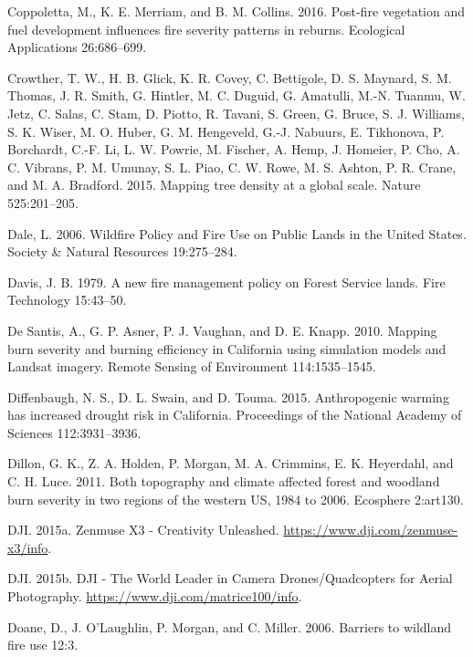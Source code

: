 \documentclass[twoside,12pt,final]{ucthesis-CA2012}
\begin{document}
\begin{ucmainmatter}
\hypertarget{ref-coppoletta2016}{}
Coppoletta, M., K. E. Merriam, and B. M. Collins. 2016. Post-fire
vegetation and fuel development influences fire severity patterns in
reburns. Ecological Applications 26:686--699.

\hypertarget{ref-crowther2015}{}
Crowther, T. W., H. B. Glick, K. R. Covey, C. Bettigole, D. S. Maynard,
S. M. Thomas, J. R. Smith, G. Hintler, M. C. Duguid, G. Amatulli, M.-N.
Tuanmu, W. Jetz, C. Salas, C. Stam, D. Piotto, R. Tavani, S. Green, G.
Bruce, S. J. Williams, S. K. Wiser, M. O. Huber, G. M. Hengeveld, G.-J.
Nabuurs, E. Tikhonova, P. Borchardt, C.-F. Li, L. W. Powrie, M. Fischer,
A. Hemp, J. Homeier, P. Cho, A. C. Vibrans, P. M. Umunay, S. L. Piao, C.
W. Rowe, M. S. Ashton, P. R. Crane, and M. A. Bradford. 2015. Mapping
tree density at a global scale. Nature 525:201--205.

\hypertarget{ref-dale2006}{}
Dale, L. 2006. Wildfire Policy and Fire Use on Public Lands in the
United States. Society \& Natural Resources 19:275--284.

\hypertarget{ref-davis1979}{}
Davis, J. B. 1979. A new fire management policy on Forest Service lands.
Fire Technology 15:43--50.

\hypertarget{ref-desantis2010}{}
De Santis, A., G. P. Asner, P. J. Vaughan, and D. E. Knapp. 2010.
Mapping burn severity and burning efficiency in California using
simulation models and Landsat imagery. Remote Sensing of Environment
114:1535--1545.

\hypertarget{ref-diffenbaugh2015}{}
Diffenbaugh, N. S., D. L. Swain, and D. Touma. 2015. Anthropogenic
warming has increased drought risk in California. Proceedings of the
National Academy of Sciences 112:3931--3936.

\hypertarget{ref-dillon2011}{}
Dillon, G. K., Z. A. Holden, P. Morgan, M. A. Crimmins, E. K. Heyerdahl,
and C. H. Luce. 2011. Both topography and climate affected forest and
woodland burn severity in two regions of the western US, 1984 to 2006.
Ecosphere 2:art130.

\hypertarget{ref-dji2015}{}
DJI. 2015a. Zenmuse X3 - Creativity Unleashed.
\url{https://www.dji.com/zenmuse-x3/info}.

\hypertarget{ref-dji2015a}{}
DJI. 2015b. DJI - The World Leader in Camera Drones/Quadcopters for
Aerial Photography. \url{https://www.dji.com/matrice100/info}.

\hypertarget{ref-doane2006}{}
Doane, D., J. O'Laughlin, P. Morgan, and C. Miller. 2006. Barriers to
wildland fire use 12:3.


\end{ucmainmatter}
\end{document}
